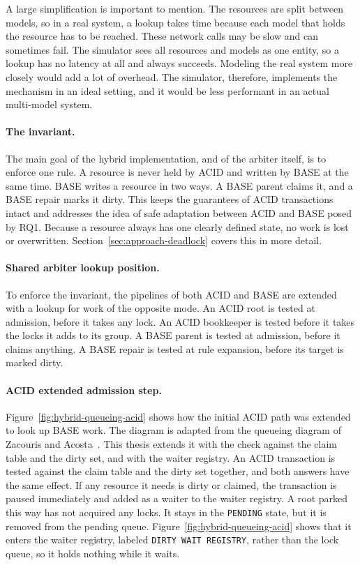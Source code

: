 A large simplification is important to mention. The resources are split
between models, so in a real system, a lookup takes time because each model
that holds the resource has to be reached. These network calls may be slow
and can sometimes fail. The simulator sees all resources and models as one
entity, so a lookup has no latency at all and always succeeds. Modeling the
real system more closely would add a lot of overhead. The simulator,
therefore, implements the mechanism in an ideal setting, and it would be less
performant in an actual multi-model system.

\paragraph{The invariant.}\label{sec:approach-arbiter-rule} The main goal of
the hybrid implementation, and of the arbiter itself, is to enforce one
rule. A resource is never held by ACID and written by BASE at the same time.
BASE writes a resource in two ways. A BASE parent claims it, and a BASE repair
marks it dirty. This keeps the guarantees of ACID transactions intact and addresses the idea
of safe adaptation between ACID and BASE posed by RQ1. Because a resource
always has one clearly defined state, no work is lost or overwritten.
Section~\ref{sec:approach-deadlock} covers this in more detail.

\paragraph{Shared arbiter lookup position.}\label{sec:approach-enforcement}
To enforce the invariant, the pipelines of both ACID and BASE are extended
with a lookup for work of the opposite mode. An ACID root is tested at
admission, before it takes any lock. An ACID bookkeeper is tested before it
takes the locks it adds to its group. A BASE parent is tested at admission, before it
claims anything. A BASE repair is tested at rule expansion, before its
target is marked dirty.

\paragraph{ACID extended admission step.} Figure~\ref{fig:hybrid-queueing-acid}
shows how the initial ACID path was extended to look up BASE work. The diagram
is adapted from the queueing diagram of Zacouris and
Acosta~\cite{zacouris2026mxs}. This thesis extends it with the check against
the claim table and the dirty set, and with the waiter registry. An ACID transaction is tested against the claim table and the dirty
set together, and both answers have the same effect. If any resource it needs is
dirty or claimed, the transaction is paused immediately and added as a waiter to
the waiter registry. A root parked this way has not acquired any locks. It
stays in the \texttt{PENDING} state, but it is removed from the pending queue.
Figure~\ref{fig:hybrid-queueing-acid} shows that it enters the waiter registry, labeled
\texttt{DIRTY WAIT REGISTRY}, rather than the lock queue, so it holds nothing while it waits.

